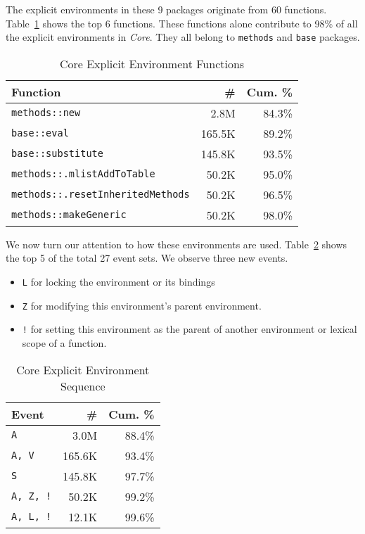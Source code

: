 \documentclass[10pt,review,sigplan,anonymous=true,authorversion=true,nonacm=true]{acmart}
\newcommand{\code}[1]{\lstinline |#1|\xspace}
\begin{document}
The explicit environments in these 9 packages originate from 60 functions.
Table~\ref{table:core_explicit_fun} shows the top 6 functions. These functions
alone contribute to 98\% of all the explicit environments in \emph{Core}. They
all belong to \code{methods} and \code{base} packages.

\begin{table}[!h]
  \vspace{-3mm}
  \small
  \caption{Core Explicit Environment Functions} \label{table:core_explicit_fun}
  \centering
  \begin{tabular}{lrr}
    \toprule
    \textbf{Function}&\textbf{\#}&\textbf{Cum. \%}\\
    \midrule
    \code{methods::new}&2.8M&84.3\%\\
    \code{base::eval}&165.5K&89.2\%\\
    \code{base::substitute}&145.8K&93.5\%\\
    \code{methods::.mlistAddToTable}&50.2K&95.0\%\\
    \code{methods::.resetInheritedMethods}&50.2K&96.5\%\\
    \code{methods::makeGeneric}&50.2K&98.0\%\\
    \bottomrule
  \end{tabular}
\end{table}

We now turn our attention to how these environments are used.
Table~\ref{table:core_explicit_env_seq} shows the top 5 of the total 27 event
sets. We observe three new events.
\begin{itemize}
\item \texttt{L} for locking the environment or its bindings
\item \texttt{Z} for modifying this environment's parent environment.
\item \texttt{!} for setting this environment as the parent of another
  environment or lexical scope of a function.
\end{itemize}

\begin{table}[!h]
  \vspace{-3mm}
  \small
  \caption{Core Explicit Environment Sequence} \label{table:core_explicit_env_seq}
  \centering
  \begin{tabular}{lrr}
    \toprule
    \textbf{Event}&\textbf{\#}&\textbf{Cum. \%}\\
    \midrule
    \texttt{A}&3.0M&88.4\%\\
    \texttt{A, V}&165.6K&93.4\%\\
    \texttt{S}&145.8K&97.7\%\\
    \texttt{A, Z, !}&50.2K&99.2\%\\
    \texttt{A, L, !}&12.1K&99.6\%\\
    \bottomrule
  \end{tabular}
\end{table}
\end{document}
